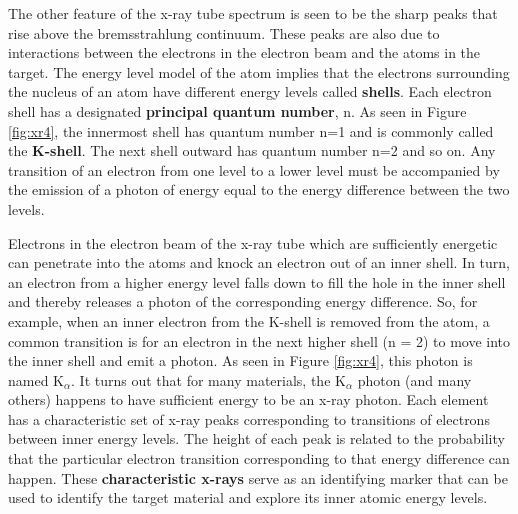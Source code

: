 The other feature of the x-ray tube spectrum is seen to be the sharp peaks that rise above the bremsstrahlung continuum. These peaks are also due to interactions between the electrons in the electron beam and the atoms in the target. The energy level model of the atom implies that the electrons surrounding the nucleus of an atom have different energy levels called {\bf shells}. Each electron shell has a designated {\bf principal quantum number}, n. As seen in Figure \ref{fig:xr4}, the innermost shell has quantum number n=1 and is commonly called the {\bf K-shell}. The next shell outward has quantum number n=2 and so on. Any transition of an electron from one level to a lower level must be accompanied by the emission of a photon of energy equal to the energy difference between the two levels.

Electrons in the electron beam of the x-ray tube which are sufficiently energetic can penetrate into the atoms and knock an electron out of an inner shell. In turn, an electron from a higher energy level falls down to fill the hole in the inner shell and thereby releases a photon of the corresponding energy difference. So, for example, when an inner electron from the K-shell is removed from the atom, a common transition is for an electron in the next higher shell (n = 2) to move into the inner shell and emit a photon. As seen in Figure \ref{fig:xr4}, this photon is named K$_{\alpha}$. It turns out that for many materials, the K$_{\alpha}$ photon (and many others) happens to have sufficient energy to be an x-ray photon. Each element has a characteristic set of x-ray peaks corresponding to transitions of electrons between inner energy levels. The height of each peak is related to the probability that the particular electron transition corresponding to that energy difference can happen. These {\bf characteristic x-rays} serve as an identifying marker that can be used to identify the target material and explore its inner atomic energy levels.

